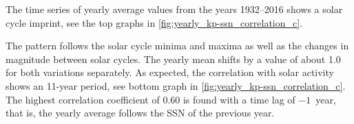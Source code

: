 The time series of yearly average \Kp{} values from the years 1932--2016 shows a solar cycle imprint, see the top graphs in \autoref{fig:yearly_kp-ssn_correlation_c}.
\begin{figure}[htb]
\end{figure}
The \Kp{} pattern follows the solar cycle minima and maxima as well as the changes in magnitude between solar cycles. The yearly mean \Kp{} shifts by a value of about \num{1.0} for both variations separately. As expected, the correlation with solar activity shows an 11-year period, see bottom graph in \autoref{fig:yearly_kp-ssn_correlation_c}. The highest correlation coefficient of \num{0.60} is found with a time lag of $-1$~year, that is, the yearly average \Kp{} follows the SSN of the previous year.

\pagebreak

